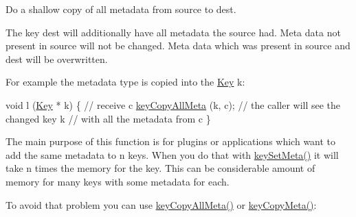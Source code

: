 Do a shallow copy of all metadata from source to dest. 

The key dest will additionally have all metadata the source had. Meta data not present in source will not be changed. Meta data which was present in source and dest will be overwritten.

For example the metadata type is copied into the \hyperlink{classkdb_1_1Key}{Key} k\+:


\begin{DoxyCodeInclude}
\textcolor{keywordtype}{void} l (\hyperlink{classkdb_1_1Key_a5679f5cae63caddd64a60388b9cc77fa}{Key} * k)
\{
        \textcolor{comment}{// receive c}
        \hyperlink{group__keymeta_ga8e63720a65610a29597494d0671f9401}{keyCopyAllMeta} (k, c);
        \textcolor{comment}{// the caller will see the changed key k}
        \textcolor{comment}{// with all the metadata from c}
\}
\end{DoxyCodeInclude}
 The main purpose of this function is for plugins or applications which want to add the same metadata to n keys. When you do that with \hyperlink{group__keymeta_gae1f15546b234ffb6007d8a31178652b9}{key\+Set\+Meta()} it will take n times the memory for the key. This can be considerable amount of memory for many keys with some metadata for each.

To avoid that problem you can use \hyperlink{group__keymeta_ga8e63720a65610a29597494d0671f9401}{key\+Copy\+All\+Meta()} or \hyperlink{group__keymeta_ga9a22b992478e613c8788bd460b4a1f0c}{key\+Copy\+Meta()}\+:


